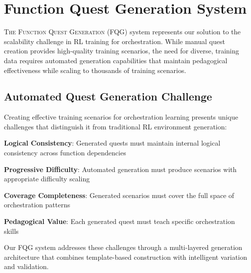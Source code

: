 
\section*{Function Quest Generation System}

\vspace{0.3cm}
\lettrine{T}{he Function Quest Generation} (FQG) system represents our solution to the scalability challenge in RL training for orchestration. While manual quest creation provides high-quality training scenarios, the need for diverse, training data requires automated generation capabilities that maintain pedagogical effectiveness while scaling to thousands of training scenarios.

\subsection*{Automated Quest Generation Challenge}

Creating effective training scenarios for orchestration learning presents unique challenges that distinguish it from traditional RL environment generation:

\begin{expandedlist}
    \item \textbf{Logical Consistency}: Generated quests must maintain internal logical consistency across function dependencies
    \item \textbf{Progressive Difficulty}: Automated generation must produce scenarios with appropriate difficulty scaling
    \item \textbf{Coverage Completeness}: Generated scenarios must cover the full space of orchestration patterns
    \item \textbf{Pedagogical Value}: Each generated quest must teach specific orchestration skills
\end{expandedlist}

Our FQG system addresses these challenges through a multi-layered generation architecture that combines template-based construction with intelligent variation and validation.

